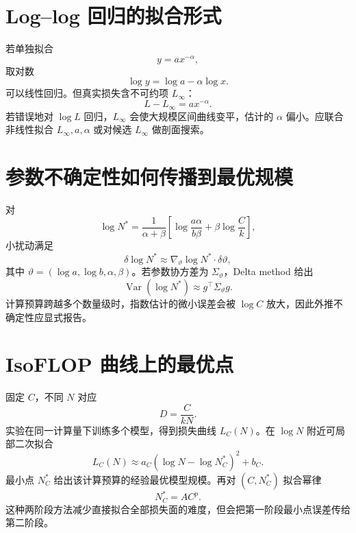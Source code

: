 \documentclass[UTF8,12pt,a4paper,fontset=none]{ctexart}
\numberwithin{equation}{section}
\begin{document}
\section{Log--log 回归的拟合形式}
若单独拟合
\begin{equation}
 y=a x^{-\alpha},
\end{equation}
取对数
\begin{equation}
 \log y=\log a-\alpha\log x.
\end{equation}
可以线性回归。但真实损失含不可约项 $L_\infty$：
\begin{equation}
 L-L_\infty=ax^{-\alpha}.
\end{equation}
若错误地对 $\log L$ 回归，$L_\infty$ 会使大规模区间曲线变平，估计的 $\alpha$ 偏小。应联合非线性拟合 $L_\infty,a,\alpha$ 或对候选 $L_\infty$ 做剖面搜索。

\section{参数不确定性如何传播到最优规模}
对
\begin{equation}
 \log N^*=\frac1{\alpha+\beta}
 \left[
 \log\frac{a\alpha}{b\beta}
 +\beta\log\frac Ck
 \right],
\end{equation}
小扰动满足
\begin{equation}
 \delta\log N^*\approx
 \nabla_\vartheta\log N^*\cdot\delta\vartheta,
\end{equation}
其中 $\vartheta=(\log a,\log b,\alpha,\beta)$。若参数协方差为 $\Sigma_\vartheta$，Delta method 给出
\begin{equation}
 \operatorname{Var}(\log N^*)
 \approx g^\top\Sigma_\vartheta g.
\end{equation}
计算预算跨越多个数量级时，指数估计的微小误差会被 $\log C$ 放大，因此外推不确定性应显式报告。

\section{IsoFLOP 曲线上的最优点}
固定 $C$，不同 $N$ 对应
\begin{equation}
 D=\frac C{kN}.
\end{equation}
实验在同一计算量下训练多个模型，得到损失曲线 $L_C(N)$。在 $\log N$ 附近可局部二次拟合
\begin{equation}
 L_C(N)\approx a_C(\log N-\log N_C^*)^2+b_C.
\end{equation}
最小点 $N_C^*$ 给出该计算预算的经验最优模型规模。再对 $(C,N_C^*)$ 拟合幂律
\begin{equation}
 N_C^*=A C^p.
\end{equation}
这种两阶段方法减少直接拟合全部损失面的难度，但会把第一阶段最小点误差传给第二阶段。
\end{document}
